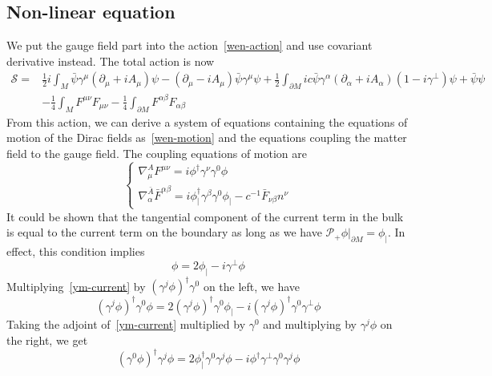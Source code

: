 \subsection{Non-linear equation}
We put the gauge field part into the action~\cref{wen-action} and use covariant derivative instead. 
The total action is now
\begin{equation*}
\begin{split}
\mathcal{S} = & \frac{1}{2}i\int_M \bar{\psi} \gamma^\mu (\partial_\mu+i A_\mu) \psi - (\partial_\mu - iA_\mu) \bar{\psi} \gamma^\mu \psi 
+ \frac{1}{2}\int_{\partial M} ic \bar{\psi} \gamma^\alpha (\partial_\alpha+iA_\alpha) (1 - i \gamma^\bot) \psi
+ \bar{\psi} \psi \\ 
%
& - \frac 1 4 \int_M F^{\mu\nu}F_{\mu\nu} - \frac 1 4 \int_{\partial M} F^{\alpha\beta}F_{\alpha\beta}
\end{split}
\end{equation*}
From this action, we can derive a system of equations containing the equations of motion of the Dirac fields as~\cref{wen-motion} and the equations coupling the matter field to the gauge field.
The coupling equations of motion are
\begin{equation*}
\begin{cases}
\nabla^A_\mu F^{\mu\nu} = i\phi^\dagger\gamma^\nu\gamma^0\phi \\
%
\nabla^{\bar{A}}_\alpha \bar{F}^{\alpha\beta} = i\phi_|^\dagger\gamma^\beta\gamma^0\phi_| -c^{-1}\bar{F}_{\nu\beta}n^\nu 
\end{cases}
\end{equation*}
It could be shown that the tangential component of the current term in the bulk is equal to the current term on the boundary as long as we have $\mathcal{P}_+\phi\vert_{\partial M} = \phi_|$. 
In effect, this condition implies
\begin{equation}\label{ym-current}
\phi = 2 \phi_| - i\gamma^\bot\phi
\end{equation}
Multiplying~\cref{ym-current} by $(\gamma^j\phi)^\dagger\gamma^0$ on the left, we have
\begin{equation}\label{ym-current1}
(\gamma^j\phi)^\dagger\gamma^0\phi = 2(\gamma^j\phi)^\dagger\gamma^0\phi_| - i(\gamma^j\phi)^\dagger\gamma^0\gamma^\bot\phi
\end{equation}
Taking the adjoint of~\cref{ym-current} multiplied by $\gamma^0$ and multiplying by $\gamma^j\phi$ on the right, we get
\begin{equation}\label{ym-current2}
(\gamma^0\phi)^\dagger\gamma^j\phi = 2\phi^\dagger_|\gamma^0\gamma^j\phi - i\phi^\dagger\gamma^\bot\gamma^0\gamma^j\phi
\end{equation}
